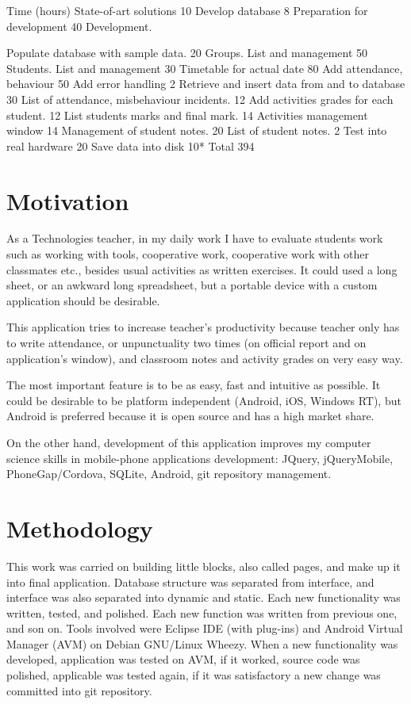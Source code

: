 Time  (hours)
State-of-art solutions
10
Develop database
8
Preparation for development
40
Development.

	Populate database with sample data.
20
	Groups. List and management
50
	Students. List and management
30
	Timetable for actual date
80
	Add attendance, behaviour
50
	Add error handling
2
	Retrieve and insert data from and to database
30
	List of attendance, misbehaviour incidents.
12
	Add activities grades for each student.
12
	List students marks and final mark.
14
	Activities management window 
14
	Management of student notes.
20
	List of student notes. 
2
Test into real hardware
20
Save data into disk
10*
Total
394

\section {Motivation}
  As a Technologies teacher, in my daily work I have to evaluate students work such as working with tools, cooperative work, cooperative work with other classmates etc., besides usual activities as written exercises. It could used a long sheet, or an awkward long spreadsheet, but a portable device with a custom application should be desirable.
  
	This application tries to increase teacher's productivity because teacher only has to write attendance, or unpunctuality two times (on official report and on application's window), and classroom notes and activity grades on very easy way.
	
	The most important feature is to be as easy, fast and intuitive as possible. It could be desirable to be platform independent (Android, iOS, Windows RT), but Android is preferred because it is open source and has a high market share.
	
	On the other hand, development of this application improves my computer science skills in  mobile-phone applications development: JQuery,  jQueryMobile, PhoneGap/Cordova, SQLite, Android,  git repository management.

\section {Methodology}

	This work was carried on building little blocks, also called pages, and make up it into final application. Database structure was separated from interface, and interface was also separated into dynamic and static. Each new functionality was written, tested, and polished. Each new function was written from previous one, and son on.
	Tools involved were Eclipse IDE (with plug-ins) and Android Virtual Manager (AVM) on Debian GNU/Linux Wheezy. When a new functionality was developed, application was tested on AVM,  if it worked, source code was polished, applicable was tested again, if it was satisfactory a new change was committed into git repository. 
